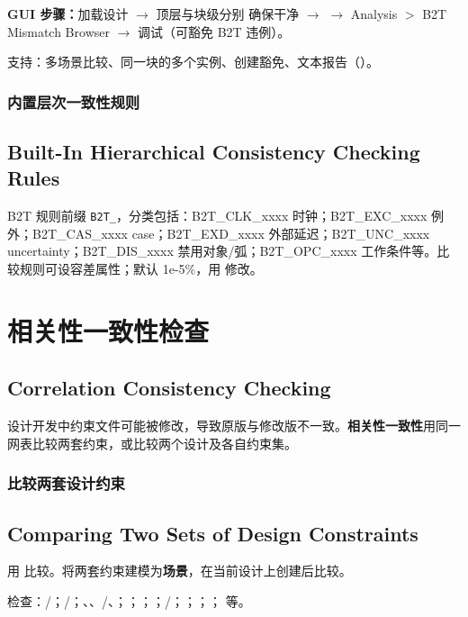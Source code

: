 \textbf{GUI 步骤：}加载设计 $\rightarrow$ 顶层与块级分别  确保干净 $\rightarrow$  $\rightarrow$ Analysis $>$ B2T Mismatch Browser $\rightarrow$ 调试（可豁免 B2T 违例）。

支持：多场景比较、同一块的多个实例、创建豁免、文本报告（）。

\subsubsection{内置层次一致性规则}
\subsection*{Built-In Hierarchical Consistency Checking Rules}

B2T 规则前缀 \texttt{B2T\_}，分类包括：B2T\_CLK\_xxxx 时钟；B2T\_EXC\_xxxx 例外；B2T\_CAS\_xxxx case；B2T\_EXD\_xxxx 外部延迟；B2T\_UNC\_xxxx uncertainty；B2T\_DIS\_xxxx 禁用对象/弧；B2T\_OPC\_xxxx 工作条件等。比较规则可设容差属性；默认 1e-5\%，用  修改。

\section{相关性一致性检查}
\subsection*{Correlation Consistency Checking}

设计开发中约束文件可能被修改，导致原版与修改版不一致。\textbf{相关性一致性}用同一网表比较两套约束，或比较两个设计及各自约束集。

\subsubsection{比较两套设计约束}
\subsection*{Comparing Two Sets of Design Constraints}

用  比较。将两套约束建模为\textbf{场景}，在当前设计上创建后比较。

 检查：/；/；、、/、；；；；/；；；； 等。

